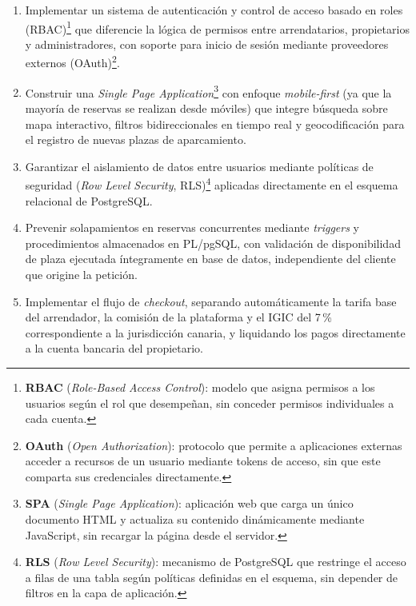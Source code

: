 \begin{enumerate}

  \item[\textbf{OE1.}] Implementar un sistema de autenticación y control de acceso basado en roles (RBAC)\footnote{\textbf{RBAC} (\textit{Role-Based Access Control}): modelo que asigna permisos a los usuarios según el rol que desempeñan, sin conceder permisos individuales a cada cuenta.} que diferencie la lógica de permisos entre arrendatarios, propietarios y administradores, con soporte para inicio de sesión mediante proveedores externos (OAuth)\footnote{\textbf{OAuth} (\textit{Open Authorization}): protocolo que permite a aplicaciones externas acceder a recursos de un usuario mediante tokens de acceso, sin que este comparta sus credenciales directamente.}.

  \item[\textbf{OE2.}] Construir una \textit{Single Page Application}\footnote{\textbf{SPA} (\textit{Single Page Application}): aplicación web que carga un único documento HTML y actualiza su contenido dinámicamente mediante JavaScript, sin recargar la página desde el servidor.} con enfoque \textit{mobile-first} (ya que la mayoría de reservas se realizan desde móviles) que integre búsqueda sobre mapa interactivo, filtros bidireccionales en tiempo real y geocodificación para el registro de nuevas plazas de aparcamiento.

  \item[\textbf{OE3.}] Garantizar el aislamiento de datos entre usuarios mediante políticas de seguridad (\textit{Row Level Security}, RLS)\footnote{\textbf{RLS} (\textit{Row Level Security}): mecanismo de PostgreSQL que restringe el acceso a filas de una tabla según políticas definidas en el esquema, sin depender de filtros en la capa de aplicación.} aplicadas directamente en el esquema relacional de PostgreSQL.

  \item[\textbf{OE4.}] Prevenir solapamientos en reservas concurrentes mediante \textit{triggers} y procedimientos almacenados en PL/pgSQL, con validación de disponibilidad de plaza ejecutada íntegramente en base de datos, independiente del cliente que origine la petición.

  \item[\textbf{OE5.}] Implementar el flujo de \textit{checkout}, separando automáticamente la tarifa base del arrendador, la comisión de la plataforma y el IGIC del 7\,\% correspondiente a la jurisdicción canaria, y liquidando los pagos directamente a la cuenta bancaria del propietario.


\end{enumerate}
